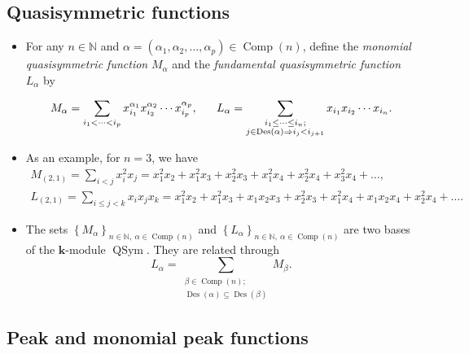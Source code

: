 \documentclass[numbers=enddot,12pt,final,onecolumn,notitlepage]{scrartcl}%
\newcommand{\al}{\alpha}
\newcommand{\NN}{\mathbb{N}} %
\newcommand{\kk}{\mathbf{k}} %
\newcommand{\QSym}{\operatorname{QSym}}
\newcommand{\Des}{\operatorname{Des}}
\newcommand{\Comp}{\operatorname{Comp}}
\newcommand{\defn}[1]{{\color{darkred}\emph{#1}}}
\newcommand{\0}{\phantom{c}}
\let\sumnonlimits\sum
\renewcommand{\sum}{\sumnonlimits\limits}
\begin{document}
\subsection{Quasisymmetric functions}


\begin{itemize}
\item For any $n \in \NN$ and $\al =(\al_1,\al_2,\dots,\al_p) \in \Comp(n)$, define the \defn{monomial quasisymmetric function} $M_\al$ and the \defn{fundamental quasisymmetric function} $L_\al$ by

\begin{equation*}
\label{eq : M+L}
M_{\al} = \sum\limits_{i_1 < \cdots < i_p} x_{i_1}^{\al_1}x_{i_2}^{\al_2} \cdots x_{i_p}^{\al_p},\;\;\;\;\;\; L_{\al} = \sum\limits_{\substack{i_1 \leq \cdots \leq i_n;\\j\in \Des(\al) \Rightarrow i_j<i_{j+1}}} x_{i_1}x_{i_2} \cdots x_{i_n}.
\end{equation*}

\item As an example, for $n=3$, we have
\begin{gather*}
M_{(2,1)}=\sum_{i<j}x_{i}^{2}x_{j}=x_{1}^{2}x_{2}+x_{1}%
^{2}x_{3}+x_{2}^{2}x_{3}+x_{1}^{2}x_{4}+x_{2}^{2}x_{4}+x_{3}^{2}x_{4}+\dots,\\
L_{(2,1)}=\sum_{i\leq j <k}x_{i}x_{j}x_k=x_{1}^{2}x_{2}+x_{1}%
^{2}x_{3}+x_{1}x_{2}x_3+x_{2}^{2}x_{3}+x_{1}^{2}x_{4}+x_{1}
x_{2}x_{4}+x_{2}^{2}x_{4}+\dots.
\end{gather*}
\item The sets $\left\{M_\al\right\}_{n\in \NN,\ \al\in \Comp(n)}$
and $\left\{L_\al\right\}_{n\in \NN,\ \al\in \Comp(n)}$
are two bases of the $\kk$-module $\QSym$.
They are related through
\begin{equation}
\label{eq : LM} L_{\al} = \sum_{{\substack{\beta \in \Comp(n);\\\Des(\alpha) \subseteq \Des(\beta)}}} M_{\beta}.
\end{equation}
\end{itemize}

\subsection{Peak and monomial peak functions}
\end{document}

